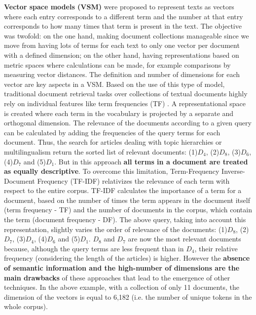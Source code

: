 \textbf{Vector space models (VSM)} \citep{Salton1983} were proposed to represent texts as vectors where each entry corresponds to a different term and the number at that entry corresponds to how many times that term is present in the text. The objective was twofold: on the one hand, making document collections manageable since we move from having lots of terms for each text to only one vector per document with a defined dimension; on the other hand, having representations based on metric spaces where calculations can be made, for example comparisons by measuring vector distances. The definition and number of dimensions for each vector are key aspects in a VSM. Based on the use of this type of model, traditional document retrieval tasks over collections of textual documents highly rely on individual features like term frequencies (TF) \citep{Hearst1999}. A representational space is created where each term in the vocabulary is projected by a separate and orthogonal dimension. The relevance of the documents according to a given query can be calculated by adding the frequencies of the query terms for each document. Thus, the search for articles dealing with topic hierarchies or multilingualism return the sorted list of relevant documents: (1)$D_4$, (2)$D_8$, (3)$D_6$, (4)$D_7$ and (5)$D_1$. But in this approach \textbf{all terms in a document are treated as equally descriptive}. To overcome this limitation, Term-Frequency Inverse-Document Frequency (TF-IDF) \citep{lee1995} relativizes the relevance of each term with respect to the entire corpus. TF-IDF calculates the importance of a term for a document, based on the number of times the term appears in the document itself (term frequency - TF) and the number of documents in the corpus, which contain the term (document frequency - DF). The above query, taking into account this representation, slightly varies the order of relevance of the documents: (1)$D_8$, (2)$D_7$, (3)$D_4$, (4)$D_6$ and (5)$D_1$. $D_8$ and $D_7$ are now the most relevant documents because, although the query terms are less frequent than in $D_4$, their relative frequency (considering the length of the articles) is higher. However the \textbf{absence of semantic information and the high-number of dimensions are the main drawbacks} of these approaches that lead to the emergence of other techniques. In the above example, with a collection of only 11 documents, the dimension of the vectors is equal to 6,182 (i.e. the number of unique tokens in the whole corpus).


